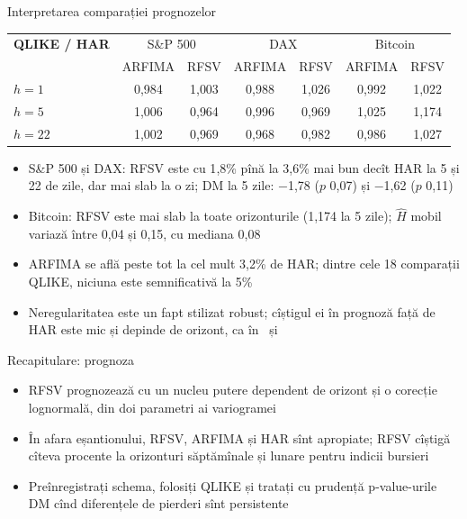 \begin{frame}{Interpretarea comparației prognozelor}
\itemsize{\footnotesize}
\begin{center}
\scriptsize
\begin{tabular}{lcccccc}
\toprule
\textbf{QLIKE / HAR} & \multicolumn{2}{c}{S\&P 500} & \multicolumn{2}{c}{DAX} & \multicolumn{2}{c}{Bitcoin} \\ & ARFIMA & RFSV & ARFIMA & RFSV & ARFIMA & RFSV \\
\midrule
$h = 1$ & 0{,}984 & 1{,}003 & 0{,}988 & 1{,}026 & 0{,}992 & 1{,}022 \\
$h = 5$ & 1{,}006 & 0{,}964 & 0{,}996 & 0{,}969 & 1{,}025 & 1{,}174 \\
$h = 22$ & 1{,}002 & 0{,}969 & 0{,}968 & 0{,}982 & 0{,}986 & 1{,}027 \\
\bottomrule
\end{tabular}
\end{center}
\begin{itemize}
    \item S\&P 500 și DAX: RFSV este cu 1{,}8\% pînă la 3{,}6\% mai bun decît HAR la 5 și 22 de zile, dar mai slab la o zi; DM la 5 zile: \ensuremath{-}1{,}78 ($p$ 0{,}07) și \ensuremath{-}1{,}62 ($p$ 0{,}11)
    \item Bitcoin: RFSV este mai slab la toate orizonturile (1{,}174 la 5 zile); $\hat H$ mobil variază între 0{,}04 și 0{,}15, cu mediana 0{,}08
    \item ARFIMA se află peste tot la cel mult 3{,}2\% de HAR; dintre cele 18 comparații QLIKE, niciuna este semnificativă la 5\%
    \item Neregularitatea este un fapt stilizat robust; cîștigul ei în prognoză față de HAR este mic și depinde de orizont, ca în \ și 
\end{itemize}
\end{frame}

\begin{frame}{Recapitulare: prognoza}
\itemsize{\small}
\begin{itemize}
    \item RFSV prognozează cu un nucleu putere dependent de orizont și o corecție lognormală, din doi parametri ai variogramei
    \item În afara eșantionului, RFSV, ARFIMA și HAR sînt apropiate; RFSV cîștigă cîteva procente la orizonturi săptămînale și lunare pentru indicii bursieri
    \item Preînregistrați schema, folosiți QLIKE și tratați cu prudență p-value-urile DM cînd diferențele de pierderi sînt persistente
\end{itemize}
\end{frame}


